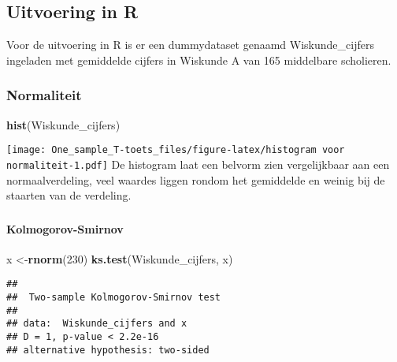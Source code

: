 \documentclass[]{article}
\newenvironment{Shaded}{\begin{snugshade}}{\end{snugshade}}
\newcommand{\DecValTok}[1]{\textcolor[rgb]{0.00,0.00,0.81}{#1}}
\newcommand{\KeywordTok}[1]{\textcolor[rgb]{0.13,0.29,0.53}{\textbf{#1}}}
\newcommand{\NormalTok}[1]{#1}
\let\oldparagraph\paragraph
\renewcommand{\paragraph}[1]{\oldparagraph{#1}\mbox{}}
\begin{document}
\hypertarget{uitvoering-in-r}{%
\subsection{Uitvoering in R}\label{uitvoering-in-r}}

Voor de uitvoering in R is er een dummydataset genaamd Wiskunde\_cijfers
ingeladen met gemiddelde cijfers in Wiskunde A van 165 middelbare
scholieren.

\hypertarget{normaliteit-1}{%
\subsubsection{Normaliteit}\label{normaliteit-1}}

\begin{Shaded}
\begin{Highlighting}[]
\KeywordTok{hist}\NormalTok{(Wiskunde_cijfers)}
\end{Highlighting}
\end{Shaded}

\texttt{[image: One\_sample\_T-toets\_files/figure-latex/histogram voor normaliteit-1.pdf]}
De histogram laat een belvorm zien vergelijkbaar aan een
normaalverdeling, veel waardes liggen rondom het gemiddelde en weinig
bij de staarten van de verdeling.

\hypertarget{section}{%
\subsubsection{}\label{section}}

\hypertarget{kolmogorov-smirnov}{%
\paragraph{Kolmogorov-Smirnov}\label{kolmogorov-smirnov}}

\begin{Shaded}
\begin{Highlighting}[]
\NormalTok{x <-}\KeywordTok{rnorm}\NormalTok{(}\DecValTok{230}\NormalTok{)}
\KeywordTok{ks.test}\NormalTok{(Wiskunde_cijfers, x)}
\end{Highlighting}
\end{Shaded}

\begin{verbatim}
## 
##  Two-sample Kolmogorov-Smirnov test
## 
## data:  Wiskunde_cijfers and x
## D = 1, p-value < 2.2e-16
## alternative hypothesis: two-sided
\end{verbatim}
\end{document}
